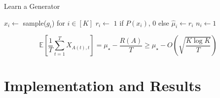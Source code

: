 \documentclass[10pt,a4paper]{article}
\begin{document}
\begin{algorithm}
    \caption{Learn a Generator}
    \label{alg:ucb1}
    \begin{algorithmic}
      \State $x_i \gets $ sample($g_i$) for $i \in [K]$
      \State $r_i \gets $ $1$ if $P(x_i)$, $0$ else 
      \State $\hat{\mu}_i \gets r_i$
      \State $n_i \gets 1$
      \EndFunction
    \end{algorithmic}
\end{algorithm}



$$
\mathbb{E}\left[\frac{1}{T}\sum_{t=1}^T X_{A(t),t}\right] = \mu_\star - \frac{R(A)}{T} \geq \mu_\star - O\left(\sqrt{\frac{K\log K}{T}}\right)
$$

\section{Implementation and Results}
\label{sec:impl}

 
\end{document}
